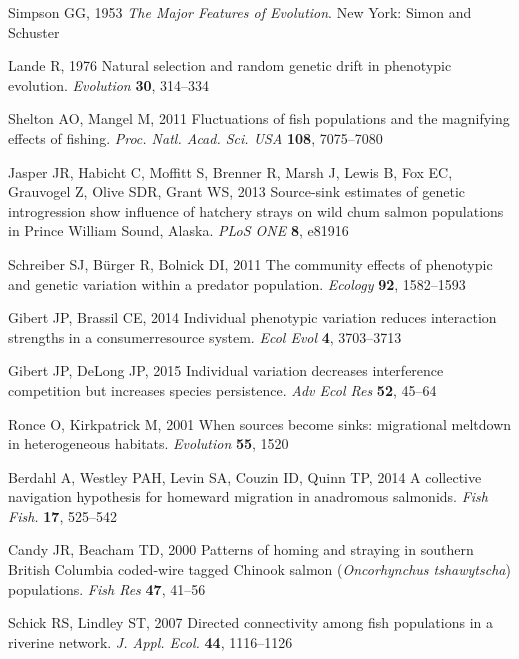 \documentclass{revtex4}
\begin{document}
\begin{thebibliography}{10}
Simpson GG, 1953 \emph{{The Major Features of Evolution}}.
\newblock New York: Simon and Schuster

Lande R, 1976 {Natural selection and random genetic drift in phenotypic
  evolution}.
\newblock \emph{Evolution} \textbf{30}, 314--334

Shelton AO, Mangel M, 2011 {Fluctuations of fish populations and the magnifying
  effects of fishing.}
\newblock \emph{Proc. Natl. Acad. Sci. USA} \textbf{108}, 7075--7080

Jasper JR, Habicht C, Moffitt S, Brenner R, Marsh J, Lewis B, Fox EC, Grauvogel
  Z, Olive SDR, Grant WS, 2013 {Source-sink estimates of genetic introgression
  show influence of hatchery strays on wild chum salmon populations in Prince
  William Sound, Alaska}.
\newblock \emph{PLoS ONE} \textbf{8}, e81916

Schreiber SJ, B{\"u}rger R, Bolnick DI, 2011 {The community effects of
  phenotypic and genetic variation within a predator population.}
\newblock \emph{Ecology} \textbf{92}, 1582--1593

Gibert JP, Brassil CE, 2014 {Individual phenotypic variation reduces
  interaction strengths in a consumer{\textendash}resource system}.
\newblock \emph{Ecol Evol} \textbf{4}, 3703--3713

Gibert JP, DeLong JP, 2015 {Individual variation decreases interference
  competition but increases species persistence}.
\newblock \emph{Adv Ecol Res} \textbf{52}, 45--64

Ronce O, Kirkpatrick M, 2001 {When sources become sinks: migrational meltdown
  in heterogeneous habitats}.
\newblock \emph{Evolution} \textbf{55}, 1520

Berdahl A, Westley PAH, Levin SA, Couzin ID, Quinn TP, 2014 {A collective
  navigation hypothesis for homeward migration in anadromous salmonids}.
\newblock \emph{Fish Fish.} \textbf{17}, 525--542

Candy JR, Beacham TD, 2000 {Patterns of homing and straying in southern British
  Columbia coded-wire tagged Chinook salmon (\emph{Oncorhynchus tshawytscha})
  populations}.
\newblock \emph{Fish Res} \textbf{47}, 41--56

Schick RS, Lindley ST, 2007 {Directed connectivity among fish populations in a
  riverine network}.
\newblock \emph{J. Appl. Ecol.} \textbf{44}, 1116--1126


\end{thebibliography}
\end{document}
